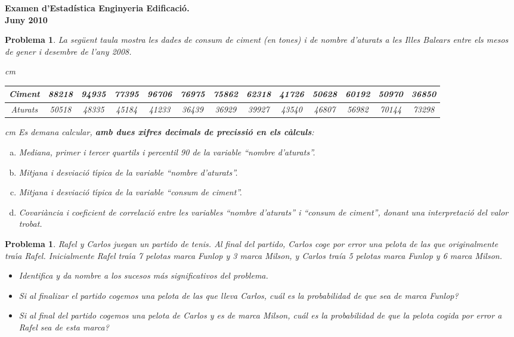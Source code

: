 \documentclass[a4paper,10pt]{article}
\newcounter{prbcont}
\newtheorem{problema}[prbcont]{Problema}
\begin{document}
\begin{center}
\textbf{{\large {Examen d'Estad\'istica Enginyeria Edificaci\'o. 
\\
Juny 2010}}}
\end{center}

\vspace{0.3cm}

\begin{problema}
La seg\"uent taula mostra les dades de consum de ciment (en tones) i de nombre d'aturats a les Illes Balears
entre els mesos de gener i desembre de l'any 2008.

 cm
\begin{tabular}{|c|cccccccccccc|}
\hline
Ciment & 88218 & 94935 & 77395 & 96706 & 76975 & 75862 & 62318 & 41726 & 50628 & 60192 & 50970 & 36850 \\
\hline
Aturats & 50518 & 48335 & 45184 & 41233 & 36439 & 36929 & 39927 & 43540 & 46807 & 56982 & 70144 & 73298 \\
\hline
\end{tabular}

 cm
\noindent
Es demana calcular, \textbf{amb dues xifres decimals de precissi\'o en els c\`alculs}:

\begin{enumerate}[a)]
\item Mediana, primer i tercer quartils i percentil 90 de la variable ``nombre d'aturats''.
\item Mitjana i desviaci\'o t\'{\i}pica de la variable ``nombre d'aturats''.
\item Mitjana i desviaci\'o t\'{\i}pica de la variable ``consum de ciment''.
\item Covari\`ancia i coeficient de correlaci\'o entre les variables ``nombre d'aturats'' i ``consum de ciment'', donant una interpretaci\'o del valor trobat.
\end{enumerate}

\end{problema}

\begin{problema} 
Rafel y Carlos juegan un partido de tenis. 
Al final del partido, Carlos coge por error una pelota de las que originalmente tra\'{\i}a Rafel.
Inicialmente Rafel tra\'{\i}a 7 pelotas marca Funlop y 3 marca Milson,
y Carlos tra\'{i}a 5 pelotas marca Funlop y 6 marca Milson.
\begin{itemize}
\item [(a)] Identifica y da nombre a los sucesos m\'as significativos del problema. 
\item [(b)] Si al finalizar el partido cogemos una pelota de las que lleva Carlos, cu\'al es la
probabilidad de que sea de marca Funlop? 
\item [(c)] Si al final del partido cogemos una pelota de Carlos y es de marca Milson, 
cu\'al es la probabilidad de que la pelota cogida por error a Rafel 
sea de esta marca?
\end{itemize}
\end{problema}
\end{document}
